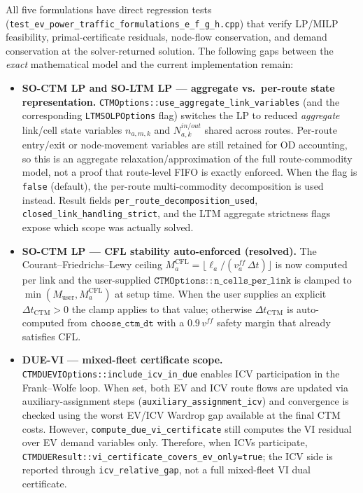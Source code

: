 \begin{remark}
\label{rem:implementation-gaps}
All five formulations have direct regression tests
(\texttt{test\_ev\_power\_traffic\_formulations\_e\_f\_g\_h.cpp}) that
verify LP/MILP feasibility, primal-certificate residuals, node-flow
conservation, and demand conservation at the solver-returned solution.
The following gaps between the \emph{exact} mathematical model and the
current implementation remain:

\begin{itemize}
  \item \textbf{SO-CTM LP and SO-LTM LP --- aggregate vs.\ per-route
    state representation.}
    \texttt{CTMOptions::use\_aggregate\_link\_variables} (and the
    corresponding \texttt{LTMSOLPOptions} flag) switches the LP to reduced
    \emph{aggregate} link/cell state variables $n_{a,m,k}$ and
    $N^{in/out}_{a,k}$ shared across routes.  Per-route entry/exit or
    node-movement variables are still retained for OD accounting, so this is
    an aggregate relaxation/approximation of the full route-commodity model,
    not a proof that route-level FIFO is exactly enforced.  When the flag is
    \texttt{false} (default), the per-route multi-commodity decomposition is
    used instead.  Result fields
    \texttt{per\_route\_decomposition\_used},
    \texttt{closed\_link\_handling\_strict}, and the LTM aggregate
    strictness flags expose which scope was actually solved.

  \item \textbf{SO-CTM LP --- CFL stability auto-enforced (resolved).}
    The Courant--Friedrichs--Lewy ceiling
    $M^{\mathrm{CFL}}_{a} = \lfloor \ell_a / (v^{ff}_a\,\Delta t) \rfloor$
    is now computed per link and the user-supplied
    $\mathtt{CTMOptions::n\_cells\_per\_link}$ is clamped to
    $\min(M_{\mathrm{user}}, M^{\mathrm{CFL}}_a)$ at setup time.
    When the user supplies an explicit $\Delta t_{\mathrm{CTM}} > 0$ the
    clamp applies to that value; otherwise
    $\Delta t_{\mathrm{CTM}}$ is auto-computed from
    $\mathtt{choose\_ctm\_dt}$ with a $0.9\,v^{ff}$ safety margin
    that already satisfies CFL.

  \item \textbf{DUE-VI --- mixed-fleet certificate scope.}
    \texttt{CTMDUEVIOptions::include\_icv\_in\_due} enables ICV
    participation in the Frank--Wolfe loop.  When set, both EV and ICV
    route flows are updated via auxiliary-assignment steps
    (\texttt{auxiliary\_assignment\_icv}) and convergence is checked using
    the worst EV/ICV Wardrop gap available at the final CTM costs.  However,
    \texttt{compute\_due\_vi\_certificate} still computes the VI residual
    over EV demand variables only.  Therefore, when ICVs participate,
    \texttt{CTMDUEResult::vi\_certificate\_covers\_ev\_only=true}; the ICV
    side is reported through \texttt{icv\_relative\_gap}, not a full
    mixed-fleet VI dual certificate.


\end{itemize}
\end{remark}
